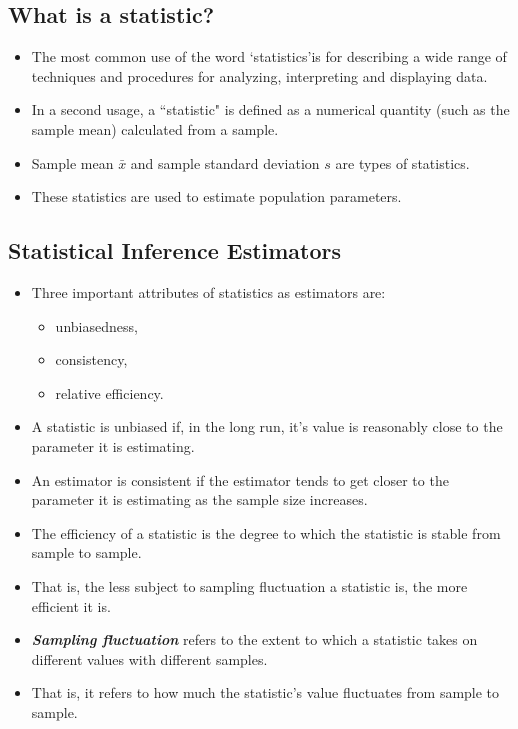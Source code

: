 \documentclass[a4paper,12pt]{article}
\begin{document}
\subsection*{What is a statistic?}
\begin{itemize}
	\item The most common use of the word `statistics'is for describing a wide range of techniques and procedures for analyzing, interpreting and displaying data.
	\item In a second usage, a ``statistic" is defined as a numerical quantity (such as the sample mean) calculated from a sample.
	\item Sample mean $\bar{x}$ and sample standard deviation $s$ are types of statistics.
	\item These statistics are used to estimate population parameters.
\end{itemize}



\subsection*{Statistical Inference Estimators}
\begin{itemize}
	\item Three important attributes of statistics as estimators are: \begin{itemize} \large
		\item unbiasedness, \item consistency,  \item  relative efficiency.\end{itemize}
	\item A statistic is unbiased if, in the long run, it's value is reasonably close to the parameter it is estimating.
	\item An estimator is consistent if the estimator tends to get closer to the parameter it is estimating as the sample size increases.

	
	\item The efficiency of a statistic is the degree to which the statistic is stable from sample to sample.
	\item That is, the less subject to sampling fluctuation a statistic is, the more efficient it is.
	\item \textbf{\emph{Sampling fluctuation}} refers to the extent to which a statistic takes on different values with different samples.
	\item That is, it refers to how much the statistic's value fluctuates from sample to sample.
	
\end{itemize}
\end{document}
